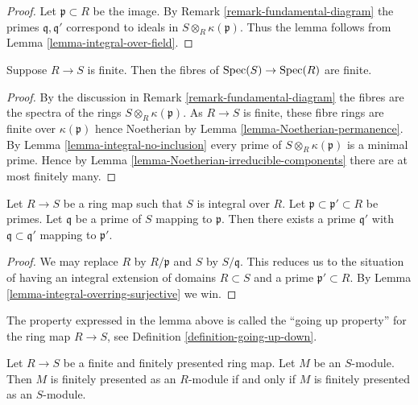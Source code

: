 \begin{proof}
Let $\mathfrak p \subset R$ be the image.
By Remark \ref{remark-fundamental-diagram}
the primes $\mathfrak q, \mathfrak q'$
correspond to ideals in
$S \otimes_R \kappa(\mathfrak p)$.
Thus the lemma follows from Lemma \ref{lemma-integral-over-field}.
\end{proof}

\begin{lemma}
\label{lemma-finite-finite-fibres}
Suppose $R \to S$ is finite.
Then the fibres of $\mathop{\mathrm{Spec}}(S) \to \mathop{\mathrm{Spec}}(R)$ are finite.
\end{lemma}

\begin{proof}
By the discussion in
Remark \ref{remark-fundamental-diagram}
the fibres are the spectra of the rings $S \otimes_R \kappa(\mathfrak p)$.
As $R \to S$ is finite, these fibre rings are finite over
$\kappa(\mathfrak p)$ hence Noetherian by
Lemma \ref{lemma-Noetherian-permanence}.
By
Lemma \ref{lemma-integral-no-inclusion}
every prime of $S \otimes_R \kappa(\mathfrak p)$ is a minimal
prime. Hence by
Lemma \ref{lemma-Noetherian-irreducible-components}
there are at most finitely many.
\end{proof}

\begin{lemma}
\label{lemma-integral-going-up}
Let $R \to S$ be a ring map such that
$S$ is integral over $R$.
Let $\mathfrak p \subset \mathfrak p' \subset R$
be primes. Let $\mathfrak q$ be a prime of $S$ mapping
to $\mathfrak p$. Then there exists a prime $\mathfrak q'$
with $\mathfrak q \subset \mathfrak q'$
mapping to $\mathfrak p'$.
\end{lemma}

\begin{proof}
We may replace $R$ by $R/\mathfrak p$ and $S$ by $S/\mathfrak q$.
This reduces us to the situation of having an integral
extension of domains $R \subset S$ and a prime $\mathfrak p' \subset R$.
By Lemma \ref{lemma-integral-overring-surjective} we win.
\end{proof}

\noindent
The property expressed in the lemma above is called
the ``going up property'' for the ring map $R \to S$,
see Definition \ref{definition-going-up-down}.

\begin{lemma}
\label{lemma-finite-finitely-presented-extension}
Let $R \to S$ be a finite and finitely presented ring map.
Let $M$ be an $S$-module.
Then $M$ is finitely presented as an $R$-module if and only if
$M$ is finitely presented as an $S$-module.
\end{lemma}

